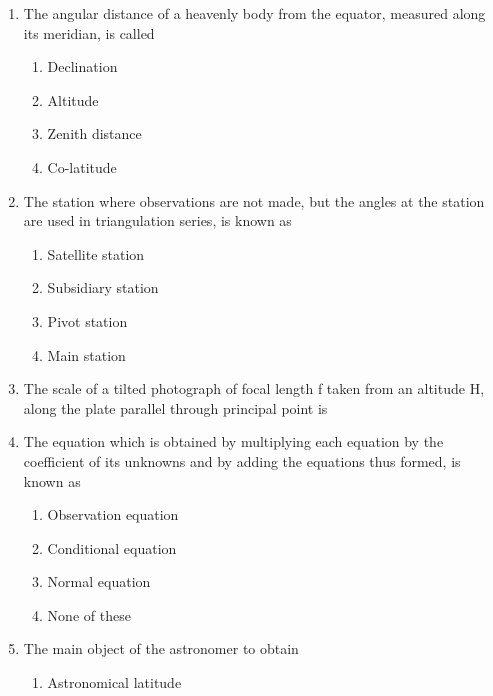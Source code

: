 \documentclass[11pt,a4paper]{article}
\begin{document}
\begin{enumerate}
\item{The angular distance of a heavenly body from the equator, measured along its meridian, is called}
\begin{enumerate}[label=\Alph*.]
\item{Declination}
\item{Altitude}
\item{Zenith distance}
\item{Co-latitude}
\end{enumerate}
\item{The station where observations are not made, but the angles at the station are used in triangulation series, is known as}
\begin{enumerate}[label=\Alph*.]
\item{Satellite station}
\item{Subsidiary station}
\item{Pivot station}
\item{Main station}
\end{enumerate}
\item{The scale of a tilted photograph of focal length f taken from an altitude H, along the plate parallel through principal point is}
\\
\item{The equation which is obtained by multiplying each equation by the coefficient of its unknowns and by adding the equations thus formed, is known as}
\begin{enumerate}[label=\Alph*.]
\item{Observation equation}
\item{Conditional equation}
\item{Normal equation}
\item{None of these}
\end{enumerate}
\item{The main object of the astronomer to obtain}
\begin{enumerate}[label=\Alph*.]
\item{Astronomical latitude}

\end{enumerate}
\end{enumerate}
\end{document}
